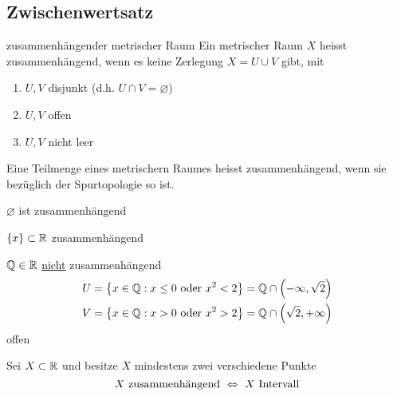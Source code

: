 \subsection{Zwischenwertsatz}
\begin{Def}{zusammenhängender metrischer Raum}
  Ein metrischer Raum $X$ heisst zusammenhängend, wenn es keine Zerlegung $X=U\cup V$ gibt, mit
  \begin{enumerate}
    \item $U,V$ disjunkt (d.h. $U\cap V=\varnothing$)
    \item $U,V$ offen
    \item $U,V$ nicht leer
  \end{enumerate}
\end{Def}
\begin{Def}
  Eine Teilmenge eines metrischern Raumes heisst zusammenhängend, wenn sie bezüglich der Spurtopologie so ist.
\end{Def}
\begin{Bsp}
  $\varnothing$ ist zusammenhängend
\end{Bsp}
\begin{Bsp}
  $\left\{ x \right\}\subset\mathbb{R}$ zusammenhängend
\end{Bsp}
\begin{Bsp}
  $\mathbb{Q}\in\mathbb{R}$ \underline{nicht} zusammenhängend
  \begin{align*}
    U&=\left\{ x\in\mathbb{Q}:x\leq 0\ \text{oder}\ x^2<2 \right\}=\mathbb{Q}\cap\left( -\infty,\sqrt{2} \right)\\
    V&=\left\{ x\in\mathbb{Q}:x>0\ \text{oder}\ x^2>2 \right\}=\mathbb{Q}\cap\left( \sqrt{2},+\infty \right)
  \end{align*}
  offen
\end{Bsp}
\begin{Sat}
  Sei $X\subset\mathbb{R}$ und besitze $X$ mindestens zwei verschiedene Punkte
  \[X\ \text{zusammenhängend}\ \Lra\ X\ \text{Intervall}\]
\end{Sat}
